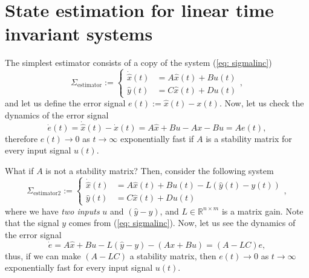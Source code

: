 \section{State estimation for linear time invariant systems}
The simplest estimator consists of a copy of the system (\ref{eq: sigmalinc})
\begin{equation}
	\Sigma_{\text{estimator}} := \begin{cases}
		\dot{\hat x}(t) &= A \hat x(t) + B u(t) \\
		\hat y(t) &= C\hat x(t) + D u(t)
	\end{cases},
\label{eq: sigmaest}
\end{equation}
and let us define the error signal $e(t) := \hat x(t) - x(t)$. Now, let us check the dynamics of the error signal
\begin{equation}
	\dot e(t) = \dot{\hat x}(t) - \dot x(t) = A\hat x + Bu - Ax - Bu = Ae(t),
\end{equation}
therefore $e(t)\to 0$ as $t\to\infty$ exponentially fast if $A$ is a stability matrix for every input signal $u(t)$.

What if $A$ is not a stability matrix? Then, consider the following system
\begin{equation}
	\Sigma_{\text{estimator2}} := \begin{cases}
		\dot{\hat x}(t) &= A \hat x(t) + B u(t) - L(\hat y(t) - y(t)) \\
		\hat y(t) &= C\hat x(t) + D u(t)
	\end{cases},
\label{eq: sigmaest2}
\end{equation}
where we have \emph{two inputs} $u$ and $(\hat y - y)$, and $L\in\mathbb{R}^{n\times m}$ is a matrix gain. Note that the signal $y$ comes from (\ref{eq: sigmalinc}). Now, let us see the dynamics of the error signal
\begin{equation}
	\dot e = A\hat x + Bu - L(\hat y - y) - (Ax + Bu) = (A-LC)e,\label{eq: ed} 
\end{equation}
thus, if we can make $(A-LC)$ a stability matrix, then $e(t)\to 0$ as $t\to\infty$ exponentially fast for every input signal $u(t)$. 

